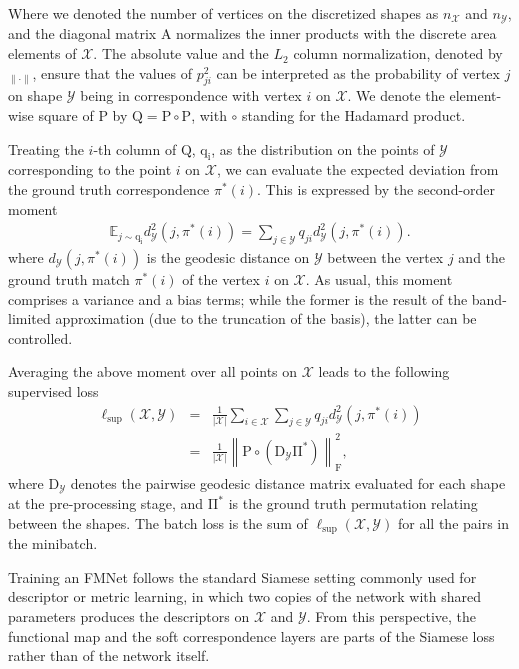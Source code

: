 \documentclass[10pt,twocolumn,letterpaper]{article}
\newcommand{\norm}[1]{\left\lVert#1\right\rVert}
\newcommand{\bb}[1]{\bm{\mathrm{#1}}}
\begin{document}
Where we denoted the number of vertices on the discretized shapes as ${n_\mathcal{X}}$ and ${n_\mathcal{Y}}$, and the diagonal matrix $\bb{A}$ normalizes the inner products with the discrete area elements of $\mathcal{X}$. 
The absolute value and the $L_2$ column normalization, denoted by $_{\| \cdot \|}$, ensure that the values of $p_{ji}^2$ can be interpreted as the probability of vertex $j$ on shape $\mathcal{Y}$ being in correspondence with vertex $i$ on $\mathcal{X}$. We denote the element-wise square of $\bb{P}$ by $\bb{Q} = \bb{P} \circ \bb{P}$, with $\circ$ standing for the Hadamard product.  




Treating the $i$-th column of $\bb{Q}$, $\bb{q_i}$, as the distribution on the points of $\mathcal{Y}$ corresponding to the point $i$ on $\mathcal{X}$, we can evaluate the expected deviation from the ground truth correspondence $\pi^*(i)$. This is expressed by the second-order moment 
\begin{eqnarray}
\mathbb{E}_{j \sim \bb{q_i} }  d^2_{\mathcal{Y}}(j,\pi^*(i)) = \sum_{j \in \mathcal{Y}}q_{ji} d^2_{\mathcal{Y}}(j,\pi^{*}(i)).
\end{eqnarray}
where  $d_{\mathcal{Y}}(j,\pi^{*}(i))$ is the geodesic distance on $\mathcal{Y}$ between the vertex $j$ and the ground truth match $\pi^{*}(i)$ of the vertex $i$ on $\mathcal{X}$.
As usual, this moment comprises a variance and a bias terms; while the former is the result of the band-limited approximation (due to the truncation of the basis), the latter can be controlled. 

Averaging the above moment over all points on $\mathcal{X}$ leads to the following supervised loss
\begin{eqnarray}
    \label{loss_supervised}
    \ell_{\mathrm{sup}} (\mathcal{X},\mathcal{Y}) &=&  \frac{1}{|\mathcal{X}|} \sum_{i \in \mathcal{X}}\sum_{j \in \mathcal{Y}}q_{ji} d^2_{\mathcal{Y}}(j,\pi^{*}(i)) \nonumber\\
    &=& \frac{1}{|\mathcal{X}|} \norm{\bb{P} \circ (\bb{D}_{\mathcal{Y}} \bb{\Pi}^* ) }_\mathrm{F}^2,
\end{eqnarray}
where $\bb{D}_{\mathcal{Y}}$ denotes the pairwise geodesic distance matrix evaluated for each shape at the pre-processing stage, and $\bb{\Pi}^*$ is the ground truth permutation relating between the shapes.  The batch loss is the sum of $\ell_{\mathrm{sup}}(\mathcal{X},\mathcal{Y})$ for all the pairs in the minibatch. 

Training an FMNet follows the standard Siamese setting commonly used for descriptor or metric learning, in which two copies of the network with shared parameters produces the descriptors on $\mathcal{X}$ and $\mathcal{Y}$. From this perspective, the functional map and the soft correspondence layers are parts of the Siamese loss rather than of the network itself.
\end{document}
